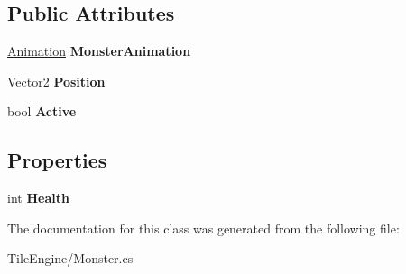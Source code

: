 \subsection*{Public Attributes}
\begin{DoxyCompactItemize}
\item 
\hypertarget{class_tile_engine_1_1_monster_a4a7445ca8fcaebf69c34678716110eeb}{\hyperlink{class_tile_engine_1_1_animation}{Animation} {\bfseries Monster\-Animation}}\label{d7/d8a/class_tile_engine_1_1_monster_a4a7445ca8fcaebf69c34678716110eeb}

\item 
\hypertarget{class_tile_engine_1_1_monster_a793d2d9816fc7793bce1c106b0623db0}{Vector2 {\bfseries Position}}\label{d7/d8a/class_tile_engine_1_1_monster_a793d2d9816fc7793bce1c106b0623db0}

\item 
\hypertarget{class_tile_engine_1_1_monster_a02284f88a72e281f261b544f744fdfab}{bool {\bfseries Active}}\label{d7/d8a/class_tile_engine_1_1_monster_a02284f88a72e281f261b544f744fdfab}

\end{DoxyCompactItemize}
\subsection*{Properties}
\begin{DoxyCompactItemize}
\item 
\hypertarget{class_tile_engine_1_1_monster_aab1854412a7509be407e2487ae02eea5}{int {\bfseries Health}}\label{d7/d8a/class_tile_engine_1_1_monster_aab1854412a7509be407e2487ae02eea5}

\end{DoxyCompactItemize}


The documentation for this class was generated from the following file\-:\begin{DoxyCompactItemize}
\item 
Tile\-Engine/Monster.\-cs\end{DoxyCompactItemize}

